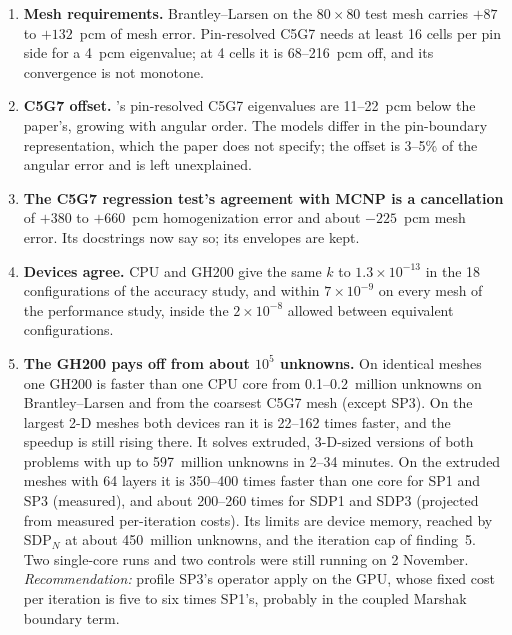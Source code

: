 \begin{enumerate}
\item \textbf{Mesh requirements.} Brantley--Larsen on the
  $80 \times 80$ test mesh carries $+87$ to $+132$~pcm of mesh error.
  Pin-resolved C5G7 needs at least 16 cells per pin side for a 4~pcm
  eigenvalue; at 4 cells it is 68--216~pcm off, and its convergence is not
  monotone.

\item \textbf{C5G7 offset.} \garnet's pin-resolved C5G7 eigenvalues are
  11--22~pcm below the paper's, growing with angular order. The models
  differ in the pin-boundary representation, which the paper does not
  specify; the offset is 3--5\% of the angular error and is left
  unexplained.

\item \textbf{The C5G7 regression test's agreement with MCNP is a
  cancellation} of $+380$ to $+660$~pcm homogenization error and about
  $-225$~pcm mesh error. Its docstrings now say so; its envelopes are kept.

\item \textbf{Devices agree.} CPU and GH200 give the same $k$ to
  $1.3 \times 10^{-13}$ in the 18 configurations of the accuracy study, and
  within $7 \times 10^{-9}$ on every mesh of the performance study, inside
  the $2 \times 10^{-8}$ allowed between equivalent configurations.

\item \textbf{The GH200 pays off from about $10^5$ unknowns.} On identical
  meshes one GH200 is faster than one CPU core from 0.1--0.2~million unknowns
  on Brantley--Larsen and from the coarsest C5G7 mesh (except SP3). On the
  largest 2-D meshes both devices ran it is 22--162 times faster, and the
  speedup is still rising there. It solves extruded, 3-D-sized versions of
  both problems with up to 597~million unknowns in 2--34 minutes. On the
  extruded meshes with 64 layers it is 350--400 times faster than one core
  for SP1 and SP3 (measured), and about 200--260 times for SDP1 and SDP3
  (projected from measured per-iteration costs). Its limits are device
  memory, reached by SDP$_N$ at about 450~million unknowns, and the
  iteration cap of finding~5. Two single-core runs and two controls were
  still running on 2 November. \emph{Recommendation:} profile SP3's operator apply
  on the GPU, whose fixed cost per iteration is five to six times SP1's,
  probably in the coupled Marshak boundary term.
\end{enumerate}
